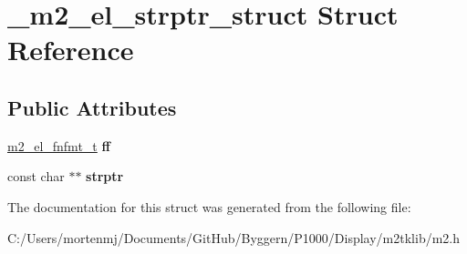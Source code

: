 \hypertarget{struct__m2__el__strptr__struct}{\section{\-\_\-m2\-\_\-el\-\_\-strptr\-\_\-struct Struct Reference}
\label{struct__m2__el__strptr__struct}
}
\subsection*{Public Attributes}
\begin{DoxyCompactItemize}
\item 
\hypertarget{struct__m2__el__strptr__struct_a4ab97649712acc2e90bd924a15da72e8}{\hyperlink{struct__m2__el__fnfmt__struct}{m2\-\_\-el\-\_\-fnfmt\-\_\-t} {\bfseries ff}}\label{struct__m2__el__strptr__struct_a4ab97649712acc2e90bd924a15da72e8}

\item 
\hypertarget{struct__m2__el__strptr__struct_ab12454d6bea70a956b95659c7070db6e}{const char $\ast$$\ast$ {\bfseries strptr}}\label{struct__m2__el__strptr__struct_ab12454d6bea70a956b95659c7070db6e}

\end{DoxyCompactItemize}


The documentation for this struct was generated from the following file\-:\begin{DoxyCompactItemize}
\item 
C\-:/\-Users/mortenmj/\-Documents/\-Git\-Hub/\-Byggern/\-P1000/\-Display/m2tklib/m2.\-h\end{DoxyCompactItemize}
